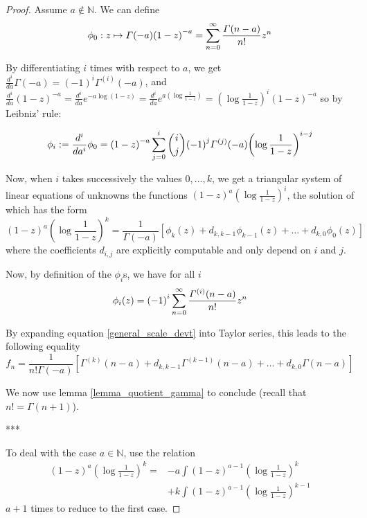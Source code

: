 \documentclass[../main.tex]{subfiles}
\begin{document}
\begin{proof}
	Assume $a \not\in \mathbb{N}$. We can define
	$$\phi_0 : z \mapsto \Gamma(-a) {(1 - z)}^{-a}
	= \sum\limits_{n = 0}^\infty \frac{\Gamma(n - a)}{n!} z^n$$
	
	By differentiating $i$ times with respect to $a$, we get $\frac{d^i}{da} \Gamma(-a) = {(-1)}^i \Gamma^{(i)}(-a)$, and
	$\frac{d^i}{da} {(1 - z)}^{-a}
	= \frac{d^i}{da} e^{-a \log(1-z)}
	= \frac{d^i}{da} e^{a \left(\log \frac{1}{1-z}\right)}
	={\left(\log \frac{1}{1-z}\right)}^i {(1 - z)}^{-a}$
	so by Leibniz' rule:
	
	\begin{equation*}
		\phi_i := \frac{d^i}{da^i} \phi_0 =
		{(1 - z)}^{-a} \sum\limits_{j = 0}^i {i \choose j} {(-1)}^j \Gamma^{(j)}(-a) {\left(\log \frac{1}{1-z}\right)}^{i-j}
	\end{equation*}
	
	Now, when $i$ takes successively the values $0, \dots, k$, we get a triangular system of linear equations of unknowns the functions ${(1-z)}^{a} {\left(\log \frac{1}{1-z}\right)}^i$, the solution of which has the form
	\begin{equation}\label{general_scale_devt}
	{(1-z)}^{a} {\left(\log \frac{1}{1-z}\right)}^k
	= \frac{1}{\Gamma(-a)} \left[ \phi_k(z) + d_{k, k - 1} \phi_{k-1}(z) + \dots + d_{k, 0} \phi_0(z) \right]
	\end{equation}
	where the coefficients $d_{i, j}$ are explicitly computable and only depend on $i$ and $j$.
	
	Now, by definition of the $\phi_i$s, we have for all $i$
	\[
	\phi_i(z) = {(-1)}^i \sum\limits_{n = 0}^\infty \frac{\Gamma^{(i)}(n - a)}{n!} z^n
	\]
	
	By expanding equation \eqref{general_scale_devt} into Taylor series, this leads to the following equality
	\[
	f_n = \frac{1}{n! \Gamma(-a)} \left[
	\Gamma^{(k)}(n - a) + d_{k, k-1} \Gamma^{(k-1)}(n - a)
	+ \dots + d_{k, 0} \Gamma(n - a)
	\right]
	\]
	
	We now use lemma \ref{lemma_quotient_gamma} to conclude (recall that $n! = \Gamma(n + 1)$).

	\begin{center}
		***
	\end{center}
	
	To deal with the case $a \in \mathbb{N}$, use the relation
	\begin{align*}
	{(1 - z)}^a {\left(\log \frac{1}{1 - z}\right)}^k
	= &-a \int {(1 - z)}^{a - 1} {\left(\log \frac{1}{1 - z}\right)}^k\\
	&+ k \int {(1 - z)}^{a - 1} {\left(\log \frac{1}{1 - z}\right)}^{k - 1}
	\end{align*}
	$a + 1$ times to reduce to the first case.
\end{proof}
\end{document}
